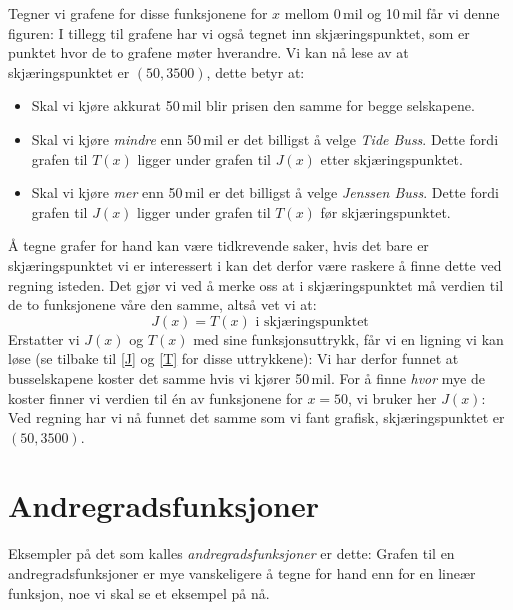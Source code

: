Tegner vi grafene for disse funksjonene for $ x $ mellom 0\,mil og 10\,mil får vi denne figuren:
I tillegg til grafene har vi også tegnet inn skjæringspunktet, som er punktet hvor de to grafene møter hverandre. Vi kan nå lese av at skjæringspunktet er $ (50, 3500) $, dette betyr at:
\begin{itemize}
	\item Skal vi kjøre akkurat 50\,mil blir prisen den samme for begge selskapene.
	\item Skal vi kjøre \textsl{mindre} enn 50\,mil er det billigst å velge \textit{Tide Buss}. Dette fordi grafen til $ T(x) $ ligger under grafen til $ J(x) $ etter skjæringspunktet.
	\item Skal vi kjøre \textsl{mer} enn 50\,mil er det billigst å velge \textit{Jenssen Buss}. Dette fordi grafen til $ J(x) $ ligger under grafen til $ T(x) $ før skjæringspunktet.
\end{itemize}
Å tegne grafer for hand kan være tidkrevende saker, hvis det bare er skjæringspunktet vi er interessert i kan det derfor være raskere å finne dette ved regning isteden. Det gjør vi ved å merke oss at i skjæringspunktet må verdien til de to funksjonene våre den samme, altså vet vi at:
\[ J(x)=T(x)\text{ i skjæringspunktet} \]
Erstatter vi $ J(x) $ og $ T(x) $ med sine funksjonsuttrykk, får vi en ligning vi kan løse (se tilbake til \eqref{J} og \eqref{T} for disse uttrykkene):
Vi har derfor funnet at busselskapene koster det samme hvis vi kjører 50\,mil. For å finne \textsl{hvor} mye de koster finner vi verdien til én av funksjonene for $ {x=50} $, vi bruker her $ J(x) $:
Ved regning har vi nå funnet det samme som vi fant grafisk, skjæringspunktet er ${ (50, 3500)} $.\regv
{}
\section{Andregradsfunksjoner}
Eksempler på det som kalles \textit{andregradsfunksjoner} er dette:
\quad
{}
Grafen til en andregradsfunksjoner er mye vanskeligere å tegne for hand enn for en lineær funksjon, noe vi skal se et eksempel på nå.\vsk

